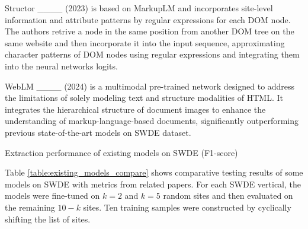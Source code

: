 Structor ____ (2023) is based on MarkupLM and incorporates site-level information and attribute patterns by regular expressions for each DOM node. The authors retrive a node in the same position from another DOM tree on the same website and then incorporate it into the input sequence, approximating character patterns of DOM nodes using regular expressions and integrating them into the neural networks logits.

WebLM ____ (2024) is a multimodal pre-trained network designed to address the limitations of solely modeling text and structure modalities of HTML. It integrates the hierarchical structure of document images to enhance the understanding of markup-language-based documents, significantly outperforming previous state-of-the-art models on SWDE dataset.

\begin{table}[ht!]
\caption{Extraction performance of existing models on SWDE (F1-score)}
\label{table:existing_models_compare}
\begin{center}

\end{center}
\end{table}

Table \ref{table:existing_models_compare} shows comparative testing results of some models on SWDE with metrics from related papers. For each SWDE vertical, the models were fine-tuned on $k=2$ and $k=5$ random sites and then evaluated on the remaining $10 - k$ sites. Ten training samples were constructed by cyclically shifting the list of sites.